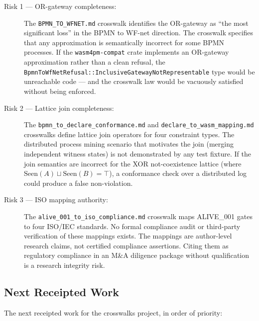 \begin{description}
  \item[Risk 1 --- \textsc{OR}-gateway completeness:] The \texttt{BPMN\_TO\_WFNET.md} crosswalk
        identifies the \textsc{OR}-gateway as ``the most significant loss'' in the \textsc{BPMN}
        to WF-net direction. The crosswalk specifies that any approximation is semantically
        incorrect for some \textsc{BPMN} processes. If the \texttt{wasm4pm-compat} crate
        implements an \textsc{OR}-gateway approximation rather than a clean refusal, the
        \texttt{BpmnToWfNetRefusal::InclusiveGatewayNotRepresentable} type would be unreachable
        code --- and the crosswalk law would be vacuously satisfied without being enforced.

  \item[Risk 2 --- Lattice join completeness:] The \texttt{bpmn\_to\_declare\_conformance.md}
        and \texttt{declare\_to\_wasm\_mapping.md} crosswalks define lattice join operators for
        four constraint types. The distributed process mining scenario that motivates the join
        (merging independent witness states) is not demonstrated by any test fixture. If the join
        semantics are incorrect for the \textsc{XOR} not-coexistence lattice (where
        $\text{Seen}(A) \sqcup \text{Seen}(B) = \top$), a conformance check over a distributed
        log could produce a false non-violation.

  \item[Risk 3 --- \textsc{ISO} mapping authority:] The \texttt{alive\_001\_to\_iso\_compliance.md}
        crosswalk maps \textsc{ALIVE\_001} gates to four \textsc{ISO/IEC} standards. No formal
        compliance audit or third-party verification of these mappings exists. The mappings are
        author-level research claims, not certified compliance assertions. Citing them as
        regulatory compliance in an M\&A diligence package without qualification is a research
        integrity risk.
\end{description}

\subsection{Next Receipted Work}
\label{sec:crosswalks-openq-next}

The next receipted work for the crosswalks project, in order of priority:

